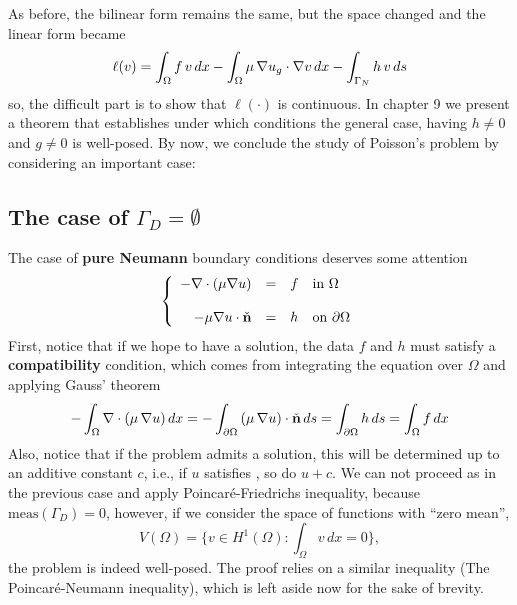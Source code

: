 As before, the bilinear form remains the same, but
the space changed and the linear form became
\begin{equation}
\ell(v) = \int_{\Omega}{f\,v} \,dx - \int_{\Omega}{\mu\,\nabla{u_g} \cdot \nabla{v}} \,dx - \int_{\Gamma_N}{h \, v} \,ds \labeq{generalellmixed}
\end{equation}
so, the difficult part is to show that $\ell(\cdot)$ is continuous.
In chapter 9 we present a  theorem that establishes under
which conditions the general case, having $h\ne 0$ and $g\ne 0$
is well-posed. By now, we conclude the study of Poisson's problem
by considering an important case:

\subsection{The case of $\Gamma_D = \emptyset$}

The case of \textbf{pure Neumann} boundary conditions deserves some attention
\begin{equation}
\left\{
\begin{array}{rcll}
-\nabla \cdot \left ( \mu \nabla{u} \right) & = & f & \mbox{in}~\Omega \\
& & & \\
-\mu \nabla{u} \cdot \check{\mathbf{n}} & = & h & \mbox{on}~\partial{\Omega}
\end{array}
\right.\labeq{poissonpureNeumann}
\end{equation}
First, notice that if we hope to have a solution, the data
$f$ and $h$ must satisfy a \textbf{compatibility}
condition, which comes from integrating the equation over $\Omega$ and applying Gauss' theorem
\begin{equation}
 -\int_{\Omega}{\nabla \cdot \left (\mu\,\nabla{u} \right ) } \,dx =
 -\int_{\partial{\Omega}}{\left (\mu\,\nabla{u} \right )\cdot \check{\mathbf{n}} } \,ds =
 \int_{\partial{\Omega}}{h} \,ds = 
 \int_{\Omega}{f} \,dx \labeq{compneumannpure}
\end{equation}
Also, notice that if the problem admits a solution, this will be determined up to an
additive constant $c$, i.e., if $u$ satisfies , so do $u + c$.
We can not proceed as in the previous case and apply Poincar\'e-Friedrichs inequality,
because $\mbox{meas}(\Gamma_D) = 0$, however, if we consider the space of
functions with ``zero mean'',
\begin{equation}
V(\Omega) = \{v \in H^1(\Omega) : \int_{\Omega}{v}\,dx = 0 \}, \nonumber
\end{equation}
the problem is indeed well-posed. The proof relies on a similar inequality
(The Poincar\'e-Neumann inequality), which is left aside now for the sake of
brevity.

